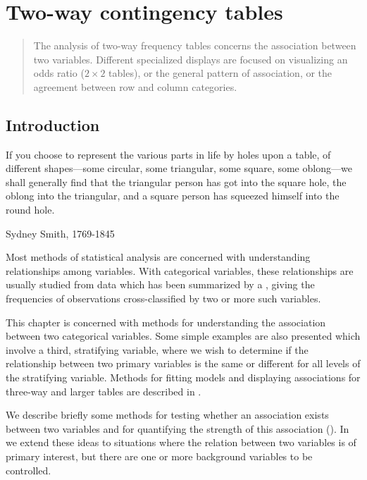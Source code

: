 \chapter{Two-way contingency tables}\label{ch:twoway}

\begin{quote}
{\Large\noindent
The analysis of two-way frequency tables concerns the association
between two variables.  Different specialized displays are focused
on visualizing an odds ratio ($2 \times 2$ tables), or the general
pattern of association, or the agreement between row and column
categories.}
\end{quote}
\minitoc
\clearpage

\section{Introduction}
\epigraph{If you choose to represent the various parts in life by
holes upon a table, of different shapes---some circular, some
triangular, some square, some oblong---we shall generally find that
the triangular person has got into the square hole, the oblong into
the triangular, and a square person has squeezed himself into the
round hole.}{Sydney Smith, 1769-1845}

Most methods of statistical analysis are concerned with understanding
relationships among variables.
With categorical variables, these relationships are usually
studied from data which has been
summarized by a
,
giving the frequencies of observations cross-classified
by two or more such variables.

This chapter is concerned with methods for understanding the association
between two categorical variables.
Some simple examples are also presented which involve a third, stratifying variable,
where we wish to determine if the relationship between two primary
variables is the same or different for all levels of the
stratifying variable.
Methods for fitting models and displaying associations for three-way
and larger tables are described in .

We describe briefly some methods for testing whether an association
exists between two variables and for quantifying the strength
of this association ().
In  we extend these ideas to situations where
the relation between two variables is of primary interest, but there
are one or more background variables to be controlled.

